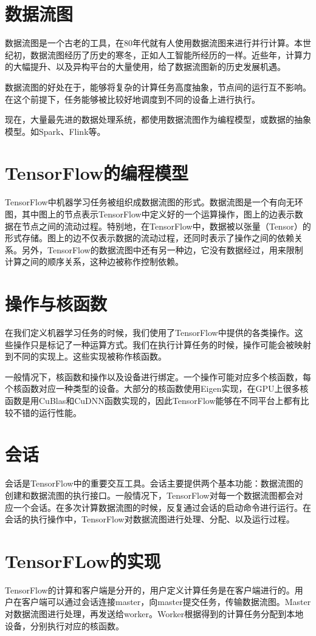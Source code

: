 \section{数据流图}
数据流图是一个古老的工具，在80年代就有人使用数据流图来进行并行计算。本世纪初，数据流图经历了历史的寒冬，正如人工智能所经历的一样。近些年，计算力的大幅提升、以及异构平台的大量使用，给了数据流图新的历史发展机遇。

数据流图的好处在于，能够将复杂的计算任务高度抽象，节点间的运行互不影响。在这个前提下，任务能够被比较好地调度到不同的设备上进行执行。

现在，大量最先进的数据处理系统，都使用数据流图作为编程模型，或数据的抽象模型。如Spark、Flink等。

\section{TensorFlow的编程模型}
TensorFlow中机器学习任务被组织成数据流图的形式。数据流图是一个有向无环图，其中图上的节点表示TensorFlow中定义好的一个运算操作，图上的边表示数据在节点之间的流动过程。特别地，在TensorFlow中，数据被以张量（Tensor）的形式存储。图上的边不仅表示数据的流动过程，还同时表示了操作之间的依赖关系。另外，TensorFlow的数据流图中还有另一种边，它没有数据经过，用来限制计算之间的顺序关系，这种边被称作控制依赖。

\section{操作与核函数}
在我们定义机器学习任务的时候，我们使用了TensorFlow中提供的各类操作。这些操作只是标记了一种运算方式。我们在执行计算任务的时候，操作可能会被映射到不同的实现上。这些实现被称作核函数。

一般情况下，核函数和操作以及设备进行绑定。一个操作可能对应多个核函数，每个核函数对应一种类型的设备。大部分的核函数使用Eigen实现，在GPU上很多核函数是用CuBlas和CuDNN函数实现的，因此TensorFlow能够在不同平台上都有比较不错的运行性能。

\section{会话}
会话是TensorFlow中的重要交互工具。会话主要提供两个基本功能：数据流图的创建和数据流图的执行接口。一般情况下，TensorFlow对每一个数据流图都会对应一个会话。在多次计算数据流图的时候，反复通过会话的启动命令进行运行。在会话的执行操作中，TensorFlow对数据流图进行处理、分配、以及运行过程。

\section{TensorFLow的实现}
TensorFlow的计算和客户端是分开的，用户定义计算任务是在客户端进行的。用户在客户端可以通过会话连接master，向master提交任务，传输数据流图。Master对数据流图进行处理，再发送给worker。Worker根据得到的计算任务分配到本地设备，分别执行对应的核函数。

